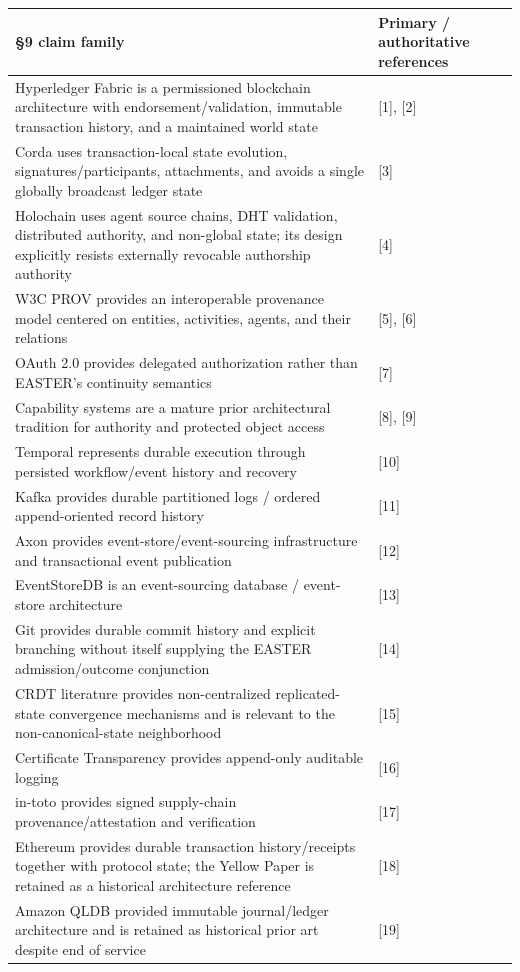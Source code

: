 \documentclass[11pt]{article}
\begin{document}
\begin{table}[htbp]
\centering
\small
\begin{tabularx}{\textwidth}{X X}
\toprule
§9 claim family & Primary / authoritative references \\
\midrule
Hyperledger Fabric is a permissioned blockchain architecture with endorsement/validation, immutable transaction history, and a maintained world state & [1], [2] \\
Corda uses transaction-local state evolution, signatures/participants, attachments, and avoids a single globally broadcast ledger state & [3] \\
Holochain uses agent source chains, DHT validation, distributed authority, and non-global state; its design explicitly resists externally revocable authorship authority & [4] \\
W3C PROV provides an interoperable provenance model centered on entities, activities, agents, and their relations & [5], [6] \\
OAuth 2.0 provides delegated authorization rather than EASTER's continuity semantics & [7] \\
Capability systems are a mature prior architectural tradition for authority and protected object access & [8], [9] \\
Temporal represents durable execution through persisted workflow/event history and recovery & [10] \\
Kafka provides durable partitioned logs / ordered append-oriented record history & [11] \\
Axon provides event-store/event-sourcing infrastructure and transactional event publication & [12] \\
EventStoreDB is an event-sourcing database / event-store architecture & [13] \\
Git provides durable commit history and explicit branching without itself supplying the EASTER admission/outcome conjunction & [14] \\
CRDT literature provides non-centralized replicated-state convergence mechanisms and is relevant to the non-canonical-state neighborhood & [15] \\
Certificate Transparency provides append-only auditable logging & [16] \\
in-toto provides signed supply-chain provenance/attestation and verification & [17] \\
Ethereum provides durable transaction history/receipts together with protocol state; the Yellow Paper is retained as a historical architecture reference & [18] \\
Amazon QLDB provided immutable journal/ledger architecture and is retained as historical prior art despite end of service & [19] \\
\bottomrule
\end{tabularx}
\end{table}
\end{document}
